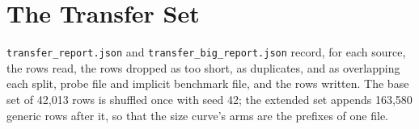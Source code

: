 \chapter{The Transfer Set}
\label{app:transfer}
\texttt{transfer\_report.json} and \texttt{transfer\_big\_report.json} record, for each source, the
rows read, the rows dropped as too short, as duplicates, and as overlapping each split, probe file
and implicit benchmark file, and the rows written. The base set of 42,013 rows is shuffled once with
seed 42; the extended set appends 163,580 generic rows after it, so that the size curve's arms are
the prefixes of one file.
